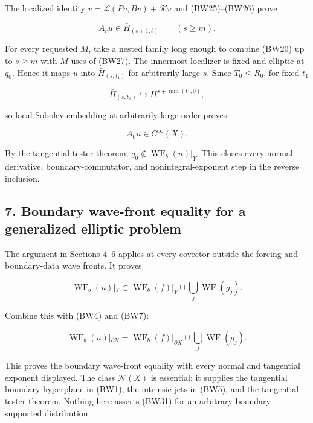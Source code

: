 \documentclass[
  11pt,
]{article}
\makeatletter
\let\ReaderOriginalAnchorStart\hyper@anchorstart
\let\ReaderOriginalAnchorEnd\hyper@anchorend
\let\ReaderPendingAliases\@empty
\def\ReaderArmAliases#1{\gdef\ReaderPendingAliases{#1}}
\def\hyper@anchorstart#1{\ReaderIfNativeAnchorTF{#1}{\ReaderPendingAliases\global\let\ReaderPendingAliases\@empty}{}\ReaderOriginalAnchorStart{#1}}
\makeatother
\begin{document}
The localized identity \(v=\mathscr L(Pv,Bv)+\mathscr Kv\) and
(BW25)--(BW26) prove

\[
 A_ru\in\bar H_{(s+1,t)}\qquad(s\geq m).
 \tag{BW27}
\]

For every requested \(M\), take a nested family long enough to combine
(BW20) up to \(s\geq m\) with \(M\) uses of (BW27). The innermost
localizer is fixed and elliptic at \(q_0\). Hence it maps \(u\) into
\(\bar H_{(s,t_1)}\) for arbitrarily large \(s\). Since \(T_0\leq R_0\),
for fixed \(t_1\)

\[
 \bar H_{(s,t_1)}\hookrightarrow H^{s+\min(t_1,0)},
 \tag{BW28}
\]

so local Sobolev embedding at arbitrarily large order proves

\[
 A_0u\in C^\infty(X).
 \tag{BW29}
\]

By the tangential tester theorem,
\(q_0\notin\operatorname{WF}_b(u)|_Y\). This closes every
normal-derivative, boundary-commutator, and nonintegral-exponent step in
the reverse inclusion.

\ReaderArmAliases{\ReaderOriginalAnchorStart{AN03-BWF-007}\ReaderOriginalAnchorEnd\begingroup\expandafter\def\csname @currentHref\endcsname{AN03-BWF-007}\label{AN03-BWF-007}\endgroup\ReaderOriginalAnchorStart{7-boundary-wave-front-equality-for-a-generalized-elliptic-problem}\ReaderOriginalAnchorEnd\begingroup\expandafter\def\csname @currentHref\endcsname{7-boundary-wave-front-equality-for-a-generalized-elliptic-problem}\label{7-boundary-wave-front-equality-for-a-generalized-elliptic-problem}\endgroup}
\subsection{7. Boundary wave-front equality for a generalized elliptic
problem}\label{boundary-wave-front-equality-for-a-generalized-elliptic-problem}

The argument in Sections 4--6 applies at every covector outside the
forcing and boundary-data wave fronts. It proves

\[
 \operatorname{WF}_b(u)|_Y
 \subset\operatorname{WF}_b(f)|_Y
      \cup\bigcup_j\operatorname{WF}(g_j).
 \tag{BW30}
\]

Combine this with (BW4) and (BW7):

\[
 \boxed{\operatorname{WF}_b(u)|_{\partial X}
 =\operatorname{WF}_b(f)|_{\partial X}
      \cup\bigcup_j\operatorname{WF}(g_j).}
 \tag{BW31}
\]

This proves the boundary wave-front equality with every normal and
tangential exponent displayed. The class \(\mathcal N(X)\) is essential:
it supplies the tangential boundary hyperplane in (BW1), the intrinsic
jets in (BW5), and the tangential tester theorem. Nothing here asserts
(BW31) for an arbitrary boundary-supported distribution.
\end{document}
